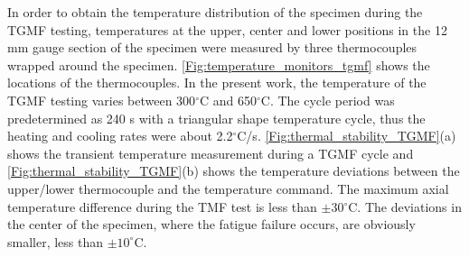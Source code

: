 \documentclass[preprint,5p,twocolumn,10pt,sort&compress]{elsarticle}
\begin{document}
In order to obtain the temperature distribution of the specimen during the TGMF testing, temperatures at the upper, center and lower positions in the 12 mm gauge section of the specimen were measured by three thermocouples wrapped around the specimen. \autoref{Fig:temperature_monitors_tgmf} shows the locations of the thermocouples. In the present work, the temperature of the TGMF testing varies between 300$^\circ$C and 650$^\circ$C. The cycle period was predetermined as 240 s with a triangular shape temperature cycle, thus the heating and cooling rates were about 2.2$^\circ$C/s.
\autoref{Fig:thermal_stability_TGMF}(a) shows the transient temperature measurement during a TGMF cycle and \autoref{Fig:thermal_stability_TGMF}(b) shows the temperature deviations between the upper/lower thermocouple and the temperature command.
The maximum axial temperature difference during the TMF test is less than $\pm30$$^\circ$C. The deviations in the center of the specimen, where the fatigue failure occurs, are obviously smaller, less than $\pm 10^\circ$C. 
\end{document}
